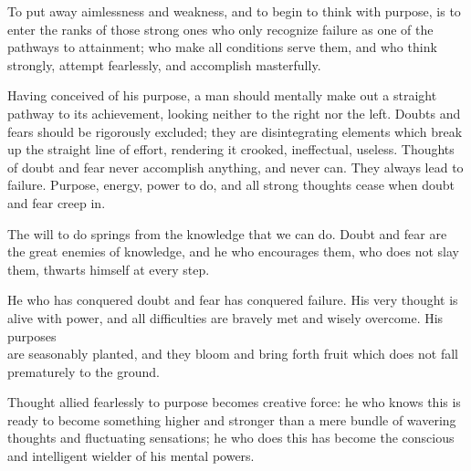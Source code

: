 \documentclass[10pt]{article}
\begin{document}
To put away aimlessness and weakness, and to begin to think with purpose, is to enter the ranks of those strong ones who only recognize failure as one of the pathways to attainment; who make all conditions serve them, and who think strongly, attempt fearlessly, and accomplish masterfully.

Having conceived of his purpose, a man should mentally make out a straight pathway to its achievement, looking neither to the right nor the left. Doubts and fears should be rigorously excluded; they are disintegrating elements which break up the straight line of effort, rendering it crooked, ineffectual, useless. Thoughts of doubt and fear never accomplish anything, and never can. They always lead to failure. Purpose, energy, power to do, and all strong thoughts cease when doubt and fear creep in.

The will to do springs from the knowledge that we can do. Doubt and fear are the great enemies of knowledge, and he who encourages them, who does not slay them, thwarts himself at every step.

He who has conquered doubt and fear has conquered failure. His very thought is alive with power, and all difficulties are bravely met and wisely overcome. His purposes\\
are seasonably planted, and they bloom and bring forth fruit which does not fall prematurely to the ground.

Thought allied fearlessly to purpose becomes creative force: he who knows this is ready to become something higher and stronger than a mere bundle of wavering thoughts and fluctuating sensations; he who does this has become the conscious and intelligent wielder of his mental powers.
\end{document}
